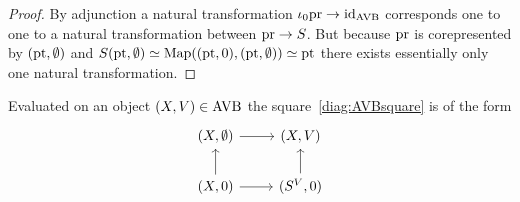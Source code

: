 \begin{proof}
    By adjunction a natural transformation $\iota_0 \mathrm{pr} \to \mathrm{id}_{\operatorname{AVB}}$ corresponds one to one to a natural transformation between 
    $\mathrm{pr} \to S$. But because $\mathrm{pr}$ is corepresented by $(\mathrm{pt}, \emptyset)$ and $S(\mathrm{pt}, \emptyset) \simeq \operatorname{Map}((\mathrm{pt}, 0), (\mathrm{pt}, \emptyset))\simeq \mathrm{pt}$
    there exists essentially only one natural transformation. 
\end{proof}

\begin{remark}
Evaluated on an object $(X,V) \in \operatorname{AVB}$ the square~\ref{diag:AVBsquare} is of the form 
\[\begin{tikzcd}
	{(X,\emptyset)} & {(X,V)} \\
	{(X,0)} & {(S^V,0)}
	\arrow[from=2-1, to=1-1]
	\arrow[from=1-1, to=1-2]
	\arrow[from=2-1, to=2-2]
	\arrow[from=2-2, to=1-2]
\end{tikzcd}\label{diag:AVBsquareeval}\]
\end{remark}






